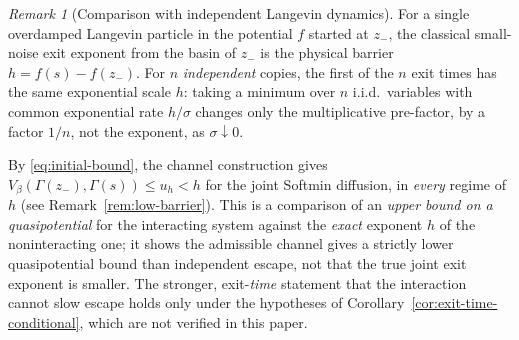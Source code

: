 \documentclass{article}
\theoremstyle{plain}
\theoremstyle{definition}
\theoremstyle{remark}
\newtheorem{remark}[theorem]{Remark}
\begin{document}
\begin{remark}[Comparison with independent Langevin dynamics]
\label{rem:comparison}
For a single overdamped Langevin particle in the potential $f$ started at $z_-$, the classical small-noise exit exponent from the basin of $z_-$ is the physical barrier $h=f(s)-f(z_-)$. For $n$ \emph{independent} copies, the first of the $n$ exit times has the same exponential scale $h$: taking a minimum over $n$ i.i.d.\ variables with common exponential rate $h/\sigma$ changes only the multiplicative pre-factor, by a factor $1/n$, not the exponent, as $\sigma\downarrow0$.

By \eqref{eq:initial-bound}, the channel construction gives $V_\beta(\Gamma(z_-),\Gamma(s))\le u_h<h$ for the joint Softmin diffusion, in \emph{every} regime of $h$ (see Remark~\ref{rem:low-barrier}). This is a comparison of an \emph{upper bound on a quasipotential} for the interacting system against the \emph{exact} exponent $h$ of the noninteracting one; it shows the admissible channel gives a strictly lower quasipotential bound than independent escape, not that the true joint exit exponent is smaller. The stronger, exit-\emph{time} statement that the interaction cannot slow escape holds only under the hypotheses of Corollary~\ref{cor:exit-time-conditional}, which are not verified in this paper.
\end{remark}
\end{document}
